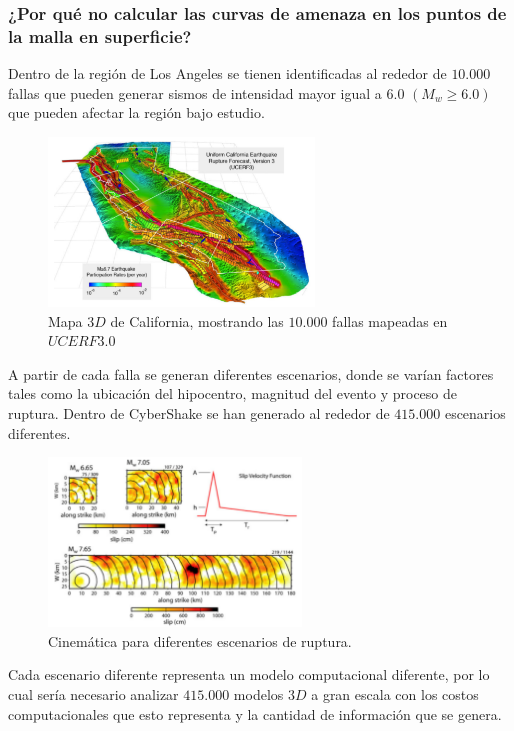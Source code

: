 %
%
\begin{frame}[allowframebreaks]
\frametitle{¿Por qué no calcular las curvas de amenaza en los puntos de la malla en superficie?}
%
\justifying
%
Dentro de la región de Los Angeles se tienen identificadas al rededor de $10.000$ fallas que pueden generar sismos de intensidad mayor igual a $6.0$ $(M_w \geq 6.0)$ que pueden afectar la región bajo estudio.
%
\begin{figure}[h]
	\centering
	\includegraphics[height=4.5cm]{img/UCERF3_Map.pdf}
	\caption{Mapa $3D$ de California, mostrando las $10.000$ fallas mapeadas en $UCERF3.0$ \cite[figura 1, página 5]{ucerf3}}
\end{figure}
%
A partir de cada falla se generan diferentes escenarios, donde se varían factores tales como la ubicación del hipocentro, magnitud del evento y proceso de ruptura. Dentro de CyberShake se han generado al rededor de $415.000$ escenarios diferentes.\\
%
\begin{figure}[h]
	\centering
	\includegraphics[height=4.5cm]{img/ModeloRuptura.pdf}
	\caption{Cinemática para diferentes escenarios de ruptura. \cite[figura 4, página 7]{gravesetal}}
\end{figure}
%
Cada escenario diferente representa un modelo computacional diferente, por lo cual sería necesario analizar $415.000$ modelos $3D$ a gran escala con los costos computacionales que esto representa y la cantidad de información que se genera.\\ 
%
%
\end{frame}
%
%
